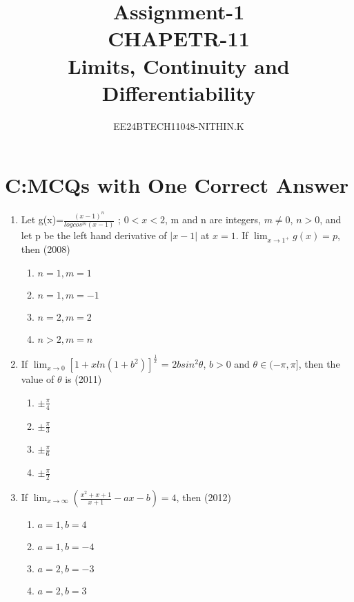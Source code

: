 \documentclass[journal,12pt,twocolumn]{IEEEtran}
\theoremstyle{remark}
\begin{document}


\title{Assignment-1\\CHAPETR-11\\Limits, Continuity and Differentiability}
\author{EE24BTECH11048-NITHIN.K} 
\maketitle
\newpage
\bigskip

\renewcommand{\thefigure}{\theenumi}
\renewcommand{\thetable}{\theenumi}


\section{C:MCQs with One Correct Answer}


\begin{enumerate} 
\item Let g(x)=$\frac{(x-1)^n}{logcos^m(x-1)}$ ; $0<x<2$, m and n are integers, $m\neq0$, $n>0$, and let p be the left hand derivative of $|x-1|$ at $x=1$. If $\lim_{x \to 1^+}{g(x)=p}$, then \hfill{(2008)} 

\begin{enumerate}[label=\alph*)]
    \item $n=1,m=1$
    \item $n=1,m=-1$
    \item $n=2,m=2$
    \item $n>2,m=n$ \\
\end{enumerate}

\item If $\lim_{x \to 0}[1+xln(1+b^2)]^\frac{1}{x}$ = $2bsin^2\theta$, $b>0$ and $\theta \in (-\pi,\pi]$, then the value of $\theta$ is 
\hfill{(2011)} 

\begin{enumerate}[label=\alph*)]
    \item $\pm\frac{\pi}{4}$
    \item $\pm\frac{\pi}{3}$
    \item $\pm\frac{\pi}{6}$
    \item $\pm\frac{\pi}{2}$ \\
\end{enumerate} 

\item If $\lim_{ x \to \infty}\left(\frac{x^2+x+1}{x+1}-ax-b\right) = 4$, then \hfill{(2012)} 

\begin{enumerate}[label=\alph*)]
    \item $a=1,b=4$
    \item $a=1,b=-4$
    \item $a=2,b=-3$
    \item $a=2,b=3$ \\
\end{enumerate}



\end{enumerate}
\end{document}
